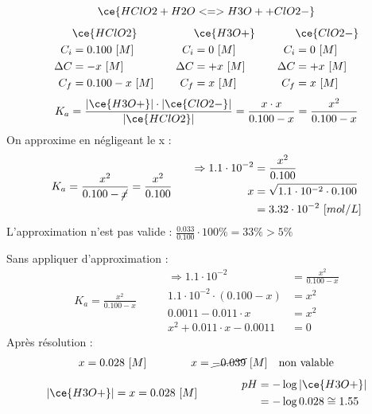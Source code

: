 \documentclass[
  11pt,
  a4paper,
  openany]{book}
\begin{document}
\begin{Answer}
\[
\ce{HClO2 + H2O <=> H3O+ + ClO2-}
\]
\[
\begin{split}
&\ce{HClO2}\\
C_i &= 0.100\ [M] \\
\Delta C &= - x\ [M] \\
C_f &= 0.100 - x\ [M] \\
\end{split}
\qquad
\begin{split}
&\ce{H3O+}\\
C_i &= 0\ [M] \\
\Delta C &= + x\ [M] \\
C_f &= x\ [M] \\
\end{split}
\qquad
\begin{split}
&\ce{ClO2-}\\
C_i &= 0\ [M] \\
\Delta C &= + x\ [M] \\
C_f &= x\ [M] \\
\end{split}
\]
\[
K_a = \frac{|\ce{H3O+}| \cdot |\ce{ClO2-}|}{|\ce{HClO2}|} = \frac{x \cdot x}{0.100-x} = \frac{x^2}{0.100-x}
\]
On approxime en négligeant le x :
\[
\begin{split}
K_a = \frac{x^2}{0.100-\cancel{x}} = \frac{x^2}{0.100}
\end{split}
\qquad
\begin{split}
\Rightarrow 1.1 \cdot 10^{-2} &= \frac{x^2}{0.100} \\
x &= \sqrt{1.1 \cdot 10^{-2} \cdot 0.100} \\
&= 3.32 \cdot 10^{-2}\ [mol/L]
\end{split}
\]
L'approximation n'est pas valide : \(\frac{0.033}{0.100} \cdot 100\% = 33\% > 5\%\)

Sans appliquer d'approximation :
\[
\begin{split}
K_a = \frac{x^2}{0.100-x}
\end{split}
\qquad
\begin{split}
\Rightarrow 1.1 \cdot 10^{-2} &= \frac{x^2}{0.100-x} \\
1.1 \cdot 10^{-2} \cdot (0.100-x) &= x^2 \\
0.0011 - 0.011 \cdot x &= x^2 \\
x^2 + 0.011 \cdot x - 0.0011 &= 0
\end{split}
\]
Après résolution :
\[
\begin{split}
x = 0.028\ [M]
\end{split}
\qquad\qquad
\begin{split}
x = \cancel{-0.039}\ [M] \quad \text{non valable}
\end{split}
\]
\[
\begin{split}
|\ce{H3O+}| = x = 0.028\ [M]
\end{split}
\qquad\qquad
\begin{split}
pH &= - \log |\ce{H3O+}| \\
 &= - \log 0.028 \cong 1.55
\end{split}
\]

\end{Answer}
\end{document}
